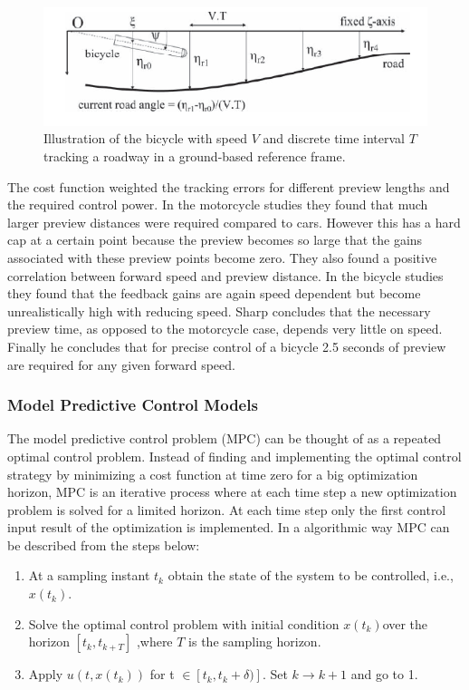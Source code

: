 \begin{figure}[ht]
    \centering
    \includegraphics[scale=0.7]{images/sharp_preview.png}
    \caption{Illustration of the bicycle with speed \ensuremath{V} and discrete time interval \ensuremath{T} tracking a roadway in a ground-based reference frame\cite{sharp2007optimal}. }
    \label{fig:figure11}
\end{figure}
The cost function weighted the tracking errors for different preview lengths and the required control power. In the motorcycle studies \cite{sharp2007motorcycle,sharp2006optimal} they found that much larger preview distances were required compared to cars. However this has a hard cap at a certain point because the preview becomes so large that the gains associated with these preview points become zero. They also found a positive correlation between forward speed and preview distance. In the bicycle studies \cite{sharp2008stability,sharp2007optimal}  they found that the feedback gains are again  speed dependent but  become unrealistically high with reducing speed. Sharp concludes that the necessary preview time, as opposed to the motorcycle case, depends very little on speed. Finally he concludes that for precise control of a bicycle 2.5 seconds of preview are required for any given forward speed.
\subsubsection{Model Predictive Control Models}

The model predictive control problem (MPC) can be thought of as a repeated optimal control problem. Instead of finding and implementing the optimal control strategy by minimizing a cost function at time zero for a big optimization horizon, MPC is an iterative process where at each time step a new optimization problem is solved for a limited horizon. At each time step only the first control input result  of the optimization is implemented. In a algorithmic way MPC can be described from the steps below:
\begin{enumerate}
    \item At a sampling instant \ensuremath{t_k} obtain the state of the system to be controlled, i.e., \ensuremath{x(t_k)}.
    \item Solve the optimal control problem with initial condition \ensuremath{x(t_k) }over the \\  horizon \ensuremath{[t_k, t_{k+T}]} ,where \ensuremath{T} is the sampling horizon.
    \item Apply \ensuremath{u(t,x(t_k))} for t \ensuremath{\in [t_k,t_k+\delta)]}. Set \ensuremath{k \rightarrow k+1} and go to 1.
\end{enumerate}

